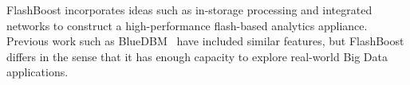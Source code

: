 FlashBoost incorporates ideas such as in-storage processing and integrated
networks to construct a high-performance flash-based analytics appliance.
Previous work such as BlueDBM~\cite{bluedbm} have included similar features, but
FlashBoost differs in the sense that it has enough capacity to explore
real-world Big Data applications.
